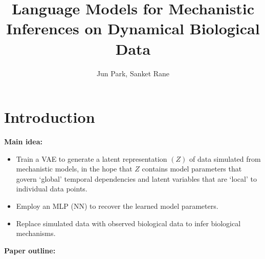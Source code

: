 \documentclass[12pt]{article} %
\begin{document}
\title{Language Models for Mechanistic Inferences on Dynamical Biological Data}
\author{Jun Park, Sanket Rane}

\maketitle

\section{Introduction}

\textbf{Main idea:}

\begin{itemize}[label=$\bullet$]
\item Train a VAE to generate a latent representation $(Z)$ of data simulated from mechanistic models, in the hope that $Z$ contains model parameters that govern `global' temporal dependencies and latent variables that are `local' to individual data points.

\item Employ an MLP (NN) to recover the learned model parameters.

\item Replace simulated data with observed biological data to infer biological mechanisms.

\end{itemize}

\vspace{6mm}

\textbf{Paper outline:}
\end{document}
